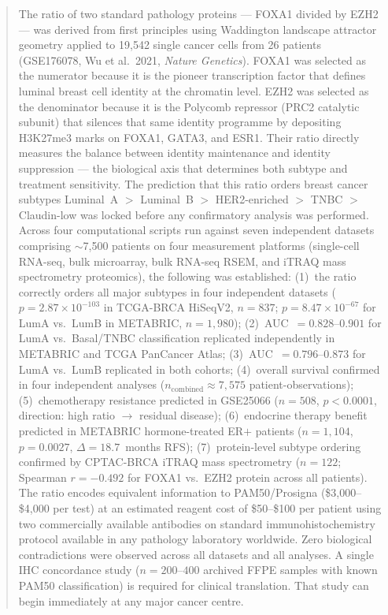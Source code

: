 \documentclass[12pt, a4paper]{article}
\begin{document}
\begin{abstract}
\noindent
The ratio of two standard pathology proteins ---
FOXA1 divided by EZH2 --- was derived from first principles
using Waddington landscape attractor geometry applied to
19,542 single cancer cells from 26 patients (GSE176078,
Wu et al.\ 2021, \textit{Nature Genetics}). FOXA1 was
selected as the numerator because it is the pioneer
transcription factor that defines luminal breast cell
identity at the chromatin level. EZH2 was selected as
the denominator because it is the Polycomb repressor
(PRC2 catalytic subunit) that silences that same identity
programme by depositing H3K27me3 marks on FOXA1, GATA3,
and ESR1. Their ratio directly measures the balance between
identity maintenance and identity suppression --- the
biological axis that determines both subtype and treatment
sensitivity. The prediction that this ratio orders
breast cancer subtypes Luminal~A $>$ Luminal~B $>$
HER2-enriched $>$ TNBC $>$ Claudin-low was locked before
any confirmatory analysis was performed. Across four
computational scripts run against seven independent datasets
comprising $\sim$7,500 patients on four measurement
platforms (single-cell RNA-seq, bulk microarray, bulk
RNA-seq RSEM, and iTRAQ mass spectrometry proteomics),
the following was established: (1)~the ratio correctly
orders all major subtypes in four independent datasets
($p = 2.87 \times 10^{-103}$ in TCGA-BRCA HiSeqV2,
$n=837$; $p = 8.47 \times 10^{-67}$ for LumA vs.\
LumB in METABRIC, $n=1{,}980$); (2)~AUC~$= 0.828$--$0.901$
for LumA vs.\ Basal/TNBC classification replicated
independently in METABRIC and TCGA PanCancer Atlas;
(3)~AUC~$= 0.796$--$0.873$ for LumA vs.\ LumB replicated
in both cohorts; (4)~overall survival confirmed in four
independent analyses ($n_{\text{combined}} \approx 7{,}575$
patient-observations); (5)~chemotherapy resistance
predicted in GSE25066 ($n=508$, $p < 0.0001$, direction:
high ratio $\rightarrow$ residual disease); (6)~endocrine
therapy benefit predicted in METABRIC hormone-treated
ER$+$ patients ($n=1{,}104$, $p=0.0027$,
$\Delta = 18.7$~months RFS); (7)~protein-level subtype
ordering confirmed by CPTAC-BRCA iTRAQ mass spectrometry
($n=122$; Spearman $r=-0.492$ for FOXA1 vs.\ EZH2
protein across all patients). The ratio encodes equivalent
information to PAM50/Prosigna (\$3,000--\$4,000 per test)
at an estimated reagent cost of \$50--\$100 per patient
using two commercially available antibodies on standard
immunohistochemistry protocol available in any pathology
laboratory worldwide. Zero biological contradictions were
observed across all datasets and all analyses. A single
IHC concordance study ($n=200$--$400$ archived FFPE samples
with known PAM50 classification) is required for clinical
translation. That study can begin immediately at any major
cancer centre.
\end{abstract}
\end{document}
